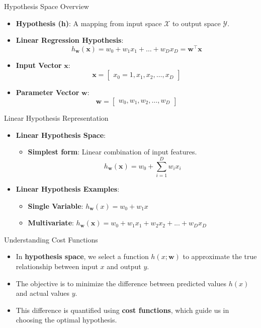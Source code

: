 \documentclass[serif, aspectratio=169]{beamer}
\begin{document}
\begin{frame}{Hypothesis Space Overview}
    \begin{itemize}
        \item \textbf{Hypothesis (h)}: A mapping from input space \( \mathcal{X} \) to output space \( \mathcal{Y} \).
        \item \textbf{Linear Regression Hypothesis}:
        \[
        h_{\mathbf{w}}(\mathbf{x}) = w_0 + w_1 x_1 + \dots + w_D x_D = \mathbf{w}^\top \mathbf{x}
        \]
        \item \textbf{Input Vector} \( \mathbf{x} \):
        \[
        \mathbf{x} = \begin{bmatrix} x_0 = 1, x_1, x_2, \dots, x_D \end{bmatrix}
        \]
        \item \textbf{Parameter Vector} \( \mathbf{w} \):
        \[
        \mathbf{w} = \begin{bmatrix} w_0, w_1, w_2, \dots, w_D \end{bmatrix}
        \]
    \end{itemize}
\end{frame}

\begin{frame}{Linear Hypothesis Representation}
    \begin{itemize}
        \item \textbf{Linear Hypothesis Space}:
        \begin{itemize}
            \item \textbf{Simplest form}: Linear combination of input features.
            \[
            h_{\mathbf{w}}(\mathbf{x}) = w_0 + \sum_{i=1}^{D} w_i x_i
            \]
        \end{itemize}
        \item \textbf{Linear Hypothesis Examples}:
        \begin{itemize}
            \item \textbf{Single Variable}: \( h_{\mathbf{w}}(x) = w_0 + w_1 x \)
            \item \textbf{Multivariate}: \( h_{\mathbf{w}}(\mathbf{x}) = w_0 + w_1 x_1 + w_2 x_2 + ... + w_D x_D \)
        \end{itemize}
    \end{itemize}
\end{frame}

\begin{frame}{Understanding Cost Functions}
    \begin{itemize}
        \item In \textbf{hypothesis space}, we select a function \( h(x; \mathbf{w}) \) to approximate the true relationship between input \( x \) and output \( y \).
        \item The objective is to minimize the difference between predicted values \( h(x) \) and actual values \( y \).
        \item This difference is quantified using \textbf{cost functions}, which guide us in choosing the optimal hypothesis.
    \end{itemize}
\end{frame}
\end{document}
